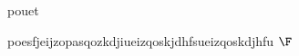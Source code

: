 \documentclass[a4page,10pt]{article}
\begin{document}
pouet
\fi

poesfjeijzopasqozkdjiueizqoskjdhfsueizqoskdjhfu
$\F$





\ifwhole
 
\end{document}
